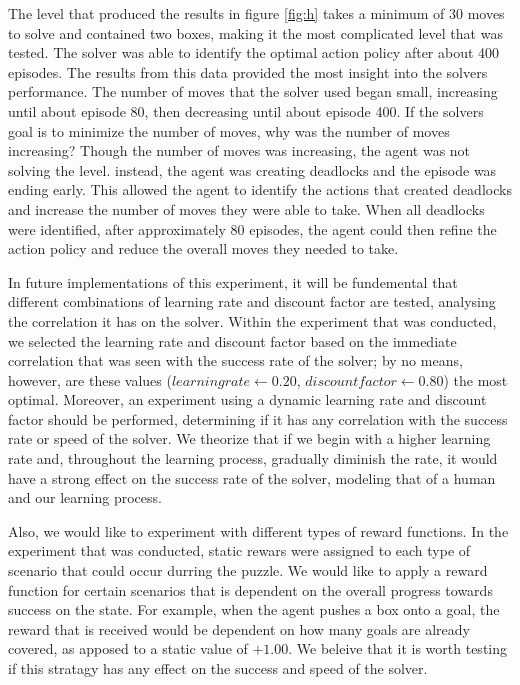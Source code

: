 \documentclass[times, 10pt,twocolumn]{article}
\begin{document}
The level that produced the results in figure \ref{fig:h} takes a minimum of 30 moves to solve and contained two boxes, making it the most complicated level that was tested. The solver was able to identify the optimal action policy after about 400 episodes. The results from this data provided the most insight into the solvers performance. The number of moves that the solver used began small, increasing until about episode 80, then decreasing until about episode 400. If the solvers goal is to minimize the number of moves, why was the number of moves increasing? Though the number of moves was increasing, the agent was not solving the level. instead, the agent was creating deadlocks and the episode was ending early. This allowed the agent to identify the actions that created deadlocks and increase the number of moves they were able to take. When all deadlocks were identified, after approximately 80 episodes, the agent could then refine the action policy and reduce the overall moves they needed to take.


In future implementations of this experiment, it will be fundemental that different combinations of learning rate and discount factor are tested, analysing the correlation it has on the solver.  Within the experiment that was conducted, we selected the learning rate and discount factor based on the immediate correlation that was seen with the success rate of the solver; by no means, however, are these values ($learning rate \gets 0.20$, $discount factor \gets 0.80$) the most optimal.  Moreover, an experiment using a dynamic learning rate and discount factor should be performed, determining if it has any correlation with the success rate or speed of the solver.  We theorize that if we begin with a higher learning rate and, throughout the learning process, gradually diminish the rate, it would have a strong effect on the success rate of the solver, modeling that of a human and our learning process.

Also, we would like to experiment with different types of reward functions.  In the experiment that was conducted, static rewars were assigned to each type of scenario that could occur durring the puzzle.  We would like to apply a reward function for certain scenarios that is dependent on the overall progress towards success on the state.  For example, when the agent pushes a box onto a goal, the reward that is received would be dependent on how many goals are already covered, as apposed to a static value of $+1.00$.  We beleive that it is worth testing if this stratagy has any effect on the success and speed of the solver.
\end{document}
